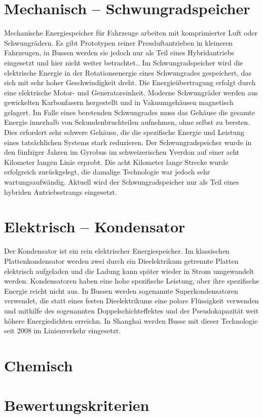 \documentclass[twoside]{scrreprt}
\begin{document}
\section{Mechanisch – Schwungradspeicher} %
Mechanische Energiespeicher für Fahrzeuge arbeiten mit komprimierter Luft oder Schwungrädern. Es gibt Prototypen reiner Pressluftantrieben in kleineren Fahrzeugen, in Bussen werden sie jedoch nur als Teil eines Hybridantriebs eingesetzt und hier nicht weiter betrachtet.\cite{Sebastian-Naumann:2014}. Im Schwungradspeicher wird die elektrische Energie in der Rotationsenergie eines Schwungrades gespeichert, das sich mit sehr hoher Geschwindigkeit dreht. Die Energieübertragung erfolgt durch eine elektrische Motor- und Generatoreinheit. Moderne Schwungräder werden aus gewickelten Karbonfasern hergestellt und in Vakuumgehäusen magnetisch gelagert. Im Falle eines berstenden Schwungrades muss das Gehäuse die gesamte Energie innerhalb von Sekundenbruchteilen aufnehmen, ohne selbst zu bersten. Dies erfordert sehr schwere Gehäuse, die die spezifische Energie und Leistung eines tatsächlichen Systems stark reduzieren. Der Schwungradspeicher wurde in den fünfziger Jahren im Gyrobus im schweizerischen Yverdon auf einer acht Kilometer langen Linie erprobt. Die acht Kilometer lange Strecke wurde erfolgreich zurückgelegt, die damalige Technologie war jedoch sehr wartungsaufwändig. Aktuell wird der Schwungradspeicher nur als Teil eines hybriden Antriebsstrangs eingesetzt.
\section{Elektrisch – Kondensator} %
Der Kondensator ist ein rein elektrischer Energiespeicher. Im klassischen Plattenkondensator werden zwei durch ein Dieelektrikum getrennte Platten elektrisch aufgeladen und die Ladung kann später wieder in Strom umgewandelt werden. Kondensatoren haben eine hohe spezifische Leistung, aber ihre spezifische Energie reicht nicht aus. In Bussen werden sogenannte Superkondensatoren verwendet, die statt eines festen Dieelektrikums eine polare Flüssigkeit verwenden und mithilfe des sogenannten Doppelschichteffektes und der Pseudokapazität weit höhere Energiedichten erreichn. In Shanghai werden Busse mit dieser Technologie seit 2008 im Linienverkehr eingesetzt.
\section{Chemisch}
\cite{Lajunen20141}
\section{Bewertungskriterien} %
\end{document}
